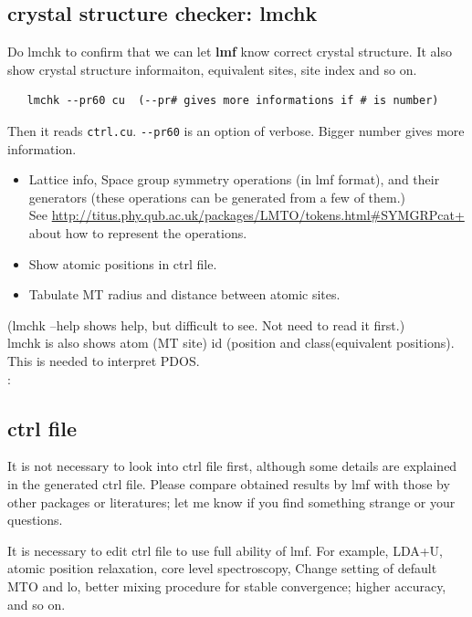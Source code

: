 \documentclass[a4paper,10pt,epsf,fleqn]{article}
\newcommand{\exe}[1]{{\bf #1}}
\begin{document}
\subsection{crystal structure checker: lmchk}
Do lmchk to confirm that we can let \exe{lmf} know correct crystal
structure. It also show crystal structure informaiton, equivalent sites,
site index and so on.
\begin{verbatim}
   lmchk --pr60 cu  (--pr# gives more informations if # is number)
\end{verbatim}
Then it reads \verb+ctrl.cu+. \verb+--pr60+ is an option of verbose. Bigger number gives more information.
\begin{itemize}
\item Lattice info, Space group symmetry operations (in lmf format), and
      their generators (these operations can be generated from a few of them.)\\
      See \url{http://titus.phy.qub.ac.uk/packages/LMTO/tokens.html#SYMGRPcat+}
      about how to represent the operations.
\item Show atomic positions in ctrl file. 
\item Tabulate MT radius and distance between atomic sites.
\end{itemize}
(lmchk --help shows help, but difficult to see. Not need to read it first.)\\

lmchk is also shows atom (MT site) id (position and class(equivalent
positions). This is needed to interpret PDOS.\\

:

\subsection{ctrl file}
It is not necessary to look into ctrl file first, 
although some details are explained in the generated ctrl file.
Please compare obtained results by lmf with those by other packages or literatures; 
let me know if you find something strange or your questions.

It is necessary to edit ctrl file to use full ability of lmf.
For example, LDA+U, atomic position relaxation, core level
spectroscopy, Change setting of default MTO and lo,
better mixing procedure for stable convergence; higher accuracy, and so on. 
\end{document}
